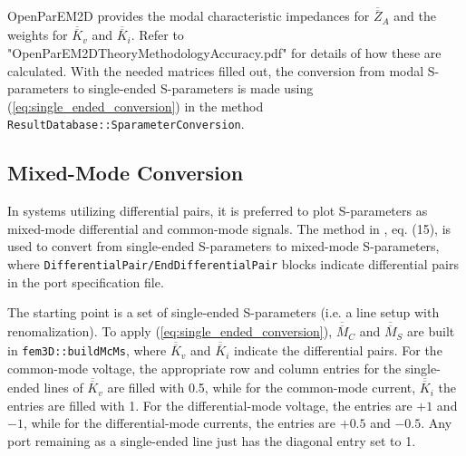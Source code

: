 \documentclass[titlepage]{article}
\renewcommand\_{\textunderscore\linebreak[1]}
\begin{document}
OpenParEM2D provides the modal characteristic impedances for $\overline{\overline{Z}}_A$ and the weights for $\overline{\overline{K}}_v$ and $\overline{\overline{K}}_i$.  Refer to "OpenParEM2D\_Theory\_Methodology\_Accuracy.pdf" for details of how these are calculated.
With the needed matrices filled out, the conversion from modal S-parameters to single-ended S-parameters is made using (\ref{eq:single_ended_conversion}) in the method \texttt{ResultDatabase::SparameterConversion}.

\subsection{Mixed-Mode Conversion}

In systems utilizing differential pairs, it is preferred to plot S-parameters as mixed-mode differential and common-mode signals. The method in \cite{Meyer}, eq. (15), is used to convert from single-ended S-parameters to mixed-mode S-parameters, where \texttt{DifferentialPair/EndDifferentialPair} blocks indicate differential pairs in the port specification file.

The starting point is a set of single-ended S-parameters (i.e. a line setup with renomalization). To apply (\ref{eq:single_ended_conversion}), $\overline{\overline{M}}_C$ and $\overline{\overline{M}}_S$ are built in \texttt{fem3D::build\_Mc\_Ms}, where $\overline{\overline{K}}_v$ and $\overline{\overline{K}}_i$ indicate the differential pairs.  For the common-mode voltage, the appropriate row and column entries for the single-ended lines of $\overline{\overline{K}}_v$ are filled with 0.5, while for the common-mode current, $\overline{\overline{K}}_i$ the entries are filled with 1.  For the differential-mode voltage, the entries are $+1$ and $-1$, while for the differential-mode currents, the entries are $+0.5$ and $-0.5$. Any port remaining as a single-ended line just has the diagonal entry set to 1.
\end{document}
